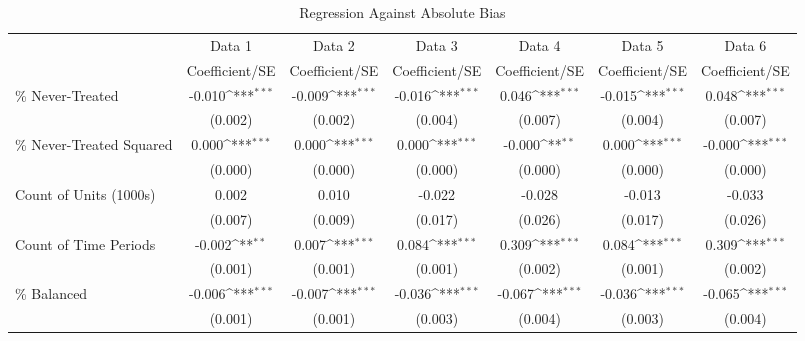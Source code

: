 \begin{table}[htbp]\centering
\def\sym#1{\ifmmode^{#1}\else\(^{#1}\)\fi}
\caption{Regression Against Absolute Bias}
\begin{tabular}{l*{6}{c}}
\hline\hline
                    &\multicolumn{1}{c}{Data 1}&\multicolumn{1}{c}{Data 2}&\multicolumn{1}{c}{Data 3}&\multicolumn{1}{c}{Data 4}&\multicolumn{1}{c}{Data 5}&\multicolumn{1}{c}{Data 6}\\
                    &Coefficient/SE         &Coefficient/SE         &Coefficient/SE         &Coefficient/SE         &Coefficient/SE         &Coefficient/SE         \\
\hline
\% Never-Treated    &      -0.010\sym{***}&      -0.009\sym{***}&      -0.016\sym{***}&       0.046\sym{***}&      -0.015\sym{***}&       0.048\sym{***}\\
                    &     (0.002)         &     (0.002)         &     (0.004)         &     (0.007)         &     (0.004)         &     (0.007)         \\
\% Never-Treated Squared&       0.000\sym{***}&       0.000\sym{***}&       0.000\sym{***}&      -0.000\sym{**} &       0.000\sym{***}&      -0.000\sym{***}\\
                    &     (0.000)         &     (0.000)         &     (0.000)         &     (0.000)         &     (0.000)         &     (0.000)         \\
Count of Units (1000s)&       0.002         &       0.010         &      -0.022         &      -0.028         &      -0.013         &      -0.033         \\
                    &     (0.007)         &     (0.009)         &     (0.017)         &     (0.026)         &     (0.017)         &     (0.026)         \\
Count of Time Periods&      -0.002\sym{**} &       0.007\sym{***}&       0.084\sym{***}&       0.309\sym{***}&       0.084\sym{***}&       0.309\sym{***}\\
                    &     (0.001)         &     (0.001)         &     (0.001)         &     (0.002)         &     (0.001)         &     (0.002)         \\
\% Balanced         &      -0.006\sym{***}&      -0.007\sym{***}&      -0.036\sym{***}&      -0.067\sym{***}&      -0.036\sym{***}&      -0.065\sym{***}\\
                    &     (0.001)         &     (0.001)         &     (0.003)         &     (0.004)         &     (0.003)         &     (0.004)         \\

\end{tabular}
\end{table}
